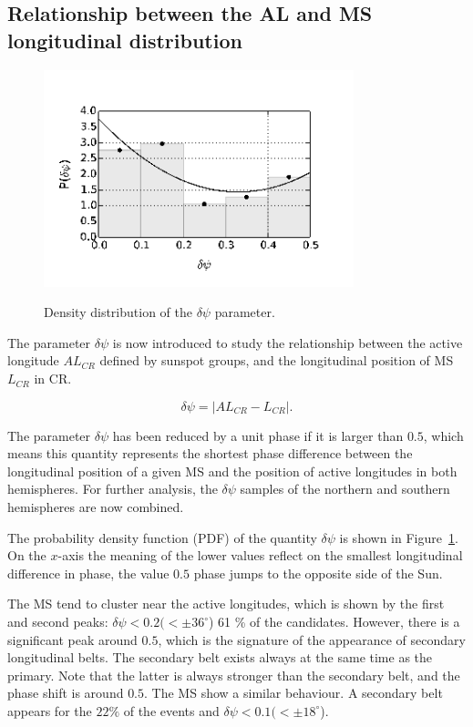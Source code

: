 \subsection{Relationship between the AL and MS longitudinal distribution}

\begin{figure}
	\centering
	{\includegraphics[width=90mm]{Chapter4/Figs/stat}}
	{\caption{Density distribution of the $\delta\psi$ parameter. }\label{stat}}
\end{figure}	

The parameter $\delta\psi$ is now introduced to study the relationship between the active longitude  $AL_{CR}$ defined by sunspot groups, and the longitudinal position of MS $L_{CR}$ in CR. 

\begin{equation}
\delta\psi = \left| AL_{CR} - L_{CR}\right|.
\end{equation}

The parameter $\delta\psi$ has been reduced by a unit phase if it is larger than $0.5$, which means this quantity represents the shortest phase difference between the longitudinal position of a given MS and the position of active longitudes in both hemispheres. For further analysis, the $\delta\psi$ samples of the northern and southern hemispheres are now combined. 

The probability density function (PDF) of the quantity $\delta\psi$ is shown in Figure~\ref{stat}. On the $x$-axis the meaning of the lower values reflect on the smallest longitudinal difference in phase, the value $0.5$ phase jumps to the opposite side of the Sun.

The MS tend to cluster near the active longitudes, which is shown by the first and second peaks: $\delta\psi< 0.2 (<\pm 36^{\circ}$) 61 \% of the candidates. However, there is a significant peak around $0.5$, which is the signature of the appearance of secondary longitudinal belts. The secondary belt exists always at the same time as the primary. Note that the latter is always stronger than the secondary belt, and the phase shift is around $0.5$. The MS show a similar behaviour. A secondary belt appears for the $22\%$ of the events and $\delta\psi< 0.1 (<\pm 18^{\circ}$).

